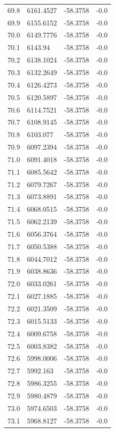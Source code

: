 \begin{table}[H]
\begin{tabular}{llll}
69.8 & 6161.4527 & -58.3758 & -0.0 \\
69.9 & 6155.6152 & -58.3758 & -0.0 \\
70.0 & 6149.7776 & -58.3758 & -0.0 \\
70.1 & 6143.94 & -58.3758 & -0.0 \\
70.2 & 6138.1024 & -58.3758 & -0.0 \\
70.3 & 6132.2649 & -58.3758 & -0.0 \\
70.4 & 6126.4273 & -58.3758 & -0.0 \\
70.5 & 6120.5897 & -58.3758 & -0.0 \\
70.6 & 6114.7521 & -58.3758 & -0.0 \\
70.7 & 6108.9145 & -58.3758 & -0.0 \\
70.8 & 6103.077 & -58.3758 & -0.0 \\
70.9 & 6097.2394 & -58.3758 & -0.0 \\
71.0 & 6091.4018 & -58.3758 & -0.0 \\
71.1 & 6085.5642 & -58.3758 & -0.0 \\
71.2 & 6079.7267 & -58.3758 & -0.0 \\
71.3 & 6073.8891 & -58.3758 & -0.0 \\
71.4 & 6068.0515 & -58.3758 & -0.0 \\
71.5 & 6062.2139 & -58.3758 & -0.0 \\
71.6 & 6056.3764 & -58.3758 & -0.0 \\
71.7 & 6050.5388 & -58.3758 & -0.0 \\
71.8 & 6044.7012 & -58.3758 & -0.0 \\
71.9 & 6038.8636 & -58.3758 & -0.0 \\
72.0 & 6033.0261 & -58.3758 & -0.0 \\
72.1 & 6027.1885 & -58.3758 & -0.0 \\
72.2 & 6021.3509 & -58.3758 & -0.0 \\
72.3 & 6015.5133 & -58.3758 & -0.0 \\
72.4 & 6009.6758 & -58.3758 & -0.0 \\
72.5 & 6003.8382 & -58.3758 & -0.0 \\
72.6 & 5998.0006 & -58.3758 & -0.0 \\
72.7 & 5992.163 & -58.3758 & -0.0 \\
72.8 & 5986.3255 & -58.3758 & -0.0 \\
72.9 & 5980.4879 & -58.3758 & -0.0 \\
73.0 & 5974.6503 & -58.3758 & -0.0 \\
73.1 & 5968.8127 & -58.3758 & -0.0 \\

\end{tabular}
\end{table}
